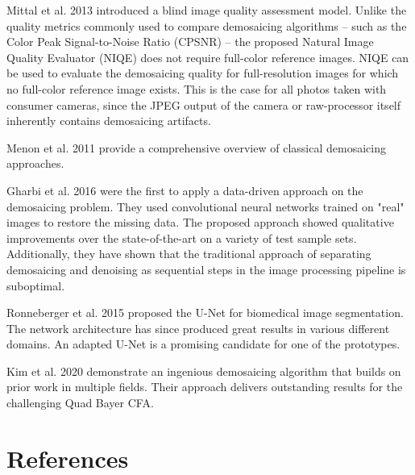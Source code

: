 \documentclass[english,notitlepage,smartquotes]{hgbreport}
\begin{document}
Mittal et al. 2013 \cite{Mittal2013} introduced a blind image quality assessment model. Unlike the quality metrics commonly used to compare demosaicing algorithms -- such as the Color Peak Signal-to-Noise Ratio (CPSNR) \cite{Menon2011} -- the proposed Natural Image Quality Evaluator (NIQE) does not require full-color reference images. NIQE can be used to evaluate the demosaicing quality for full-resolution images for which no full-color reference image exists. This is the case for all photos taken with consumer cameras, since the JPEG output of the camera or raw-processor itself inherently contains demosaicing artifacts.

Menon et al. 2011 \cite{Menon2011} provide a comprehensive overview of classical demosaicing approaches.

Gharbi et al. 2016 \cite{Gharbi2016} were the first to apply a data-driven approach on the demosaicing problem. They used convolutional neural networks trained on "real" images to restore the missing data. The proposed approach showed qualitative improvements over the state-of-the-art on a variety of test sample sets. Additionally, they have shown that the traditional approach of separating demosaicing and denoising as sequential steps in the image processing pipeline is suboptimal.

Ronneberger et al. 2015 \cite{Ronneberger2015} proposed the U-Net for biomedical image segmentation. The network architecture has since produced great results in various different domains. An adapted U-Net is a promising candidate for one of the prototypes.

Kim et al. 2020 \cite{Kim2020} demonstrate an ingenious demosaicing algorithm that builds on prior work in multiple fields. Their approach delivers outstanding results for the challenging Quad Bayer CFA.

  
\section*{References}

\printbibliography[heading=noheader]

\end{document}
